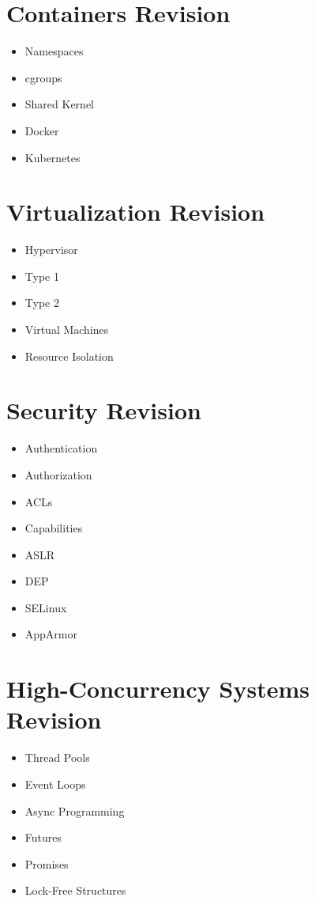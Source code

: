 \section{Containers Revision}

\begin{itemize}
\item Namespaces
\item cgroups
\item Shared Kernel
\item Docker
\item Kubernetes
\end{itemize}

\section{Virtualization Revision}

\begin{itemize}
\item Hypervisor
\item Type 1
\item Type 2
\item Virtual Machines
\item Resource Isolation
\end{itemize}

\section{Security Revision}

\begin{itemize}
\item Authentication
\item Authorization
\item ACLs
\item Capabilities
\item ASLR
\item DEP
\item SELinux
\item AppArmor
\end{itemize}

\section{High-Concurrency Systems Revision}

\begin{itemize}
\item Thread Pools
\item Event Loops
\item Async Programming
\item Futures
\item Promises
\item Lock-Free Structures
\end{itemize}


